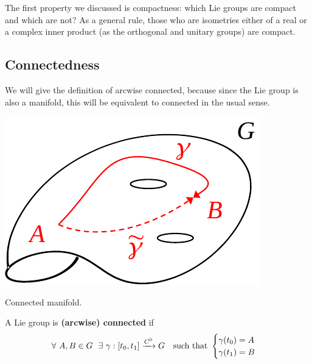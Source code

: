 \documentclass[../main.tex]{subfiles}
\begin{document}
The first property we discussed is compactness: which Lie groups are compact and which are not? As a general rule, those who are isometries either of a real or a complex inner product (as the orthogonal and unitary groups) are compact.
\subsection{Connectedness}
We will give the definition of arcwise connected, because since the Lie group is also a manifold, this will be equivalent to connected in the usual sense.
\begin{marginfigure}[-20mm]
	\includegraphics[width=1\linewidth]{images/arcwise_connected.pdf}
	\caption{Connected manifold.}
\end{marginfigure}
\begin{definition} A Lie group is \textbf{(arcwise) connected} if 
\[
\forall \ A,B\in G \ \ \exists \ \gamma:\comm{t_0}{t_1}\xrightarrow{C^0} G \ \ \text{ such that } 
\begin{cases}
    \gamma(t_0)=A\\
    \gamma(t_1)=B
\end{cases}
\]
\end{definition}
\end{document}
